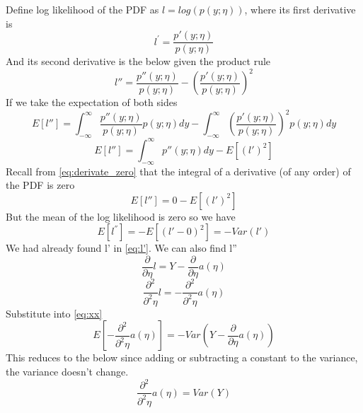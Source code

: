 \begin{answer}
    Define log likelihood of the PDF as $l=log(p(y;\eta))$, where its first derivative is
    \begin{equation}
        l^{'} = \frac{p'(y;\eta)}{p(y;\eta)}
    \end{equation}
And its second derivative is the below given the product rule
    \begin{equation}
        l'' = \frac{p''(y;\eta)}{p(y;\eta)} - (\frac{p'(y;\eta)}{p(y;\eta)})^2
    \end{equation}
 If we take the expectation of both sides
    \begin{equation}
        E[l''] = \int_{-\infty}^{\infty}\frac{p''(y;\eta)}{p(y;\eta)} p(y;\eta) dy - \int_{-\infty}^{\infty}(\frac{p'(y;\eta)}{p(y;\eta)})^2 p(y;\eta) dy
    \end{equation}
    \begin{equation}
        E[l''] = \int_{-\infty}^{\infty}p''(y;\eta) dy - E[(l')^2]
    \end{equation}
    Recall from \ref{eq:derivate_zero} that the integral of a derivative (of any order) of the PDF is zero
    \begin{equation}
        E[l''] = 0 - E[(l')^2]    \end{equation}
    But the mean of the log likelihood is zero so we have
    \begin{equation} \label{eq:xx}
        E[l^{''}] = - E[(l'- 0)^2 ] = -Var(l')
    \end{equation}
We had already found l' in \ref{eq:l'}. We can also find l''
    \begin{equation} 
        \frac{\partial}{\partial\eta}l = Y - \frac{\partial}{\partial\eta} a(\eta)
    \end{equation}
    \begin{equation}
        \frac{\partial^2}{\partial^2\eta}l = - \frac{\partial^2}{\partial^2\eta} a(\eta)
    \end{equation}
 Substitute into \ref{eq:xx}
    \begin{equation}
        E[- \frac{\partial^2}{\partial^2\eta} a(\eta)] = -Var(Y - \frac{\partial}{\partial\eta} a(\eta))
    \end{equation}
This reduces to the below since adding or subtracting a constant to the variance, the variance doesn't change.
    \begin{equation} \label{eq:varboy}
        \frac{\partial^2}{\partial^2\eta} a(\eta) = Var(Y)
    \end{equation}
\end{answer}
